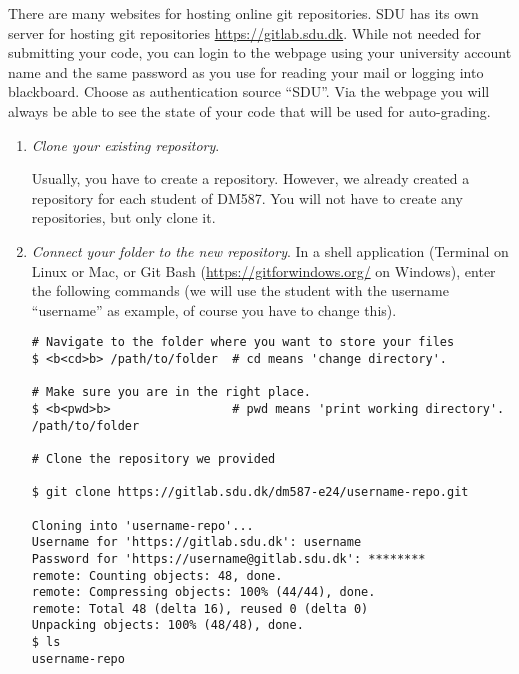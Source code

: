 There are many websites for hosting online git repositories. SDU has its own server for hosting git repositories  \url{https://gitlab.sdu.dk}. While not needed for submitting your code, you can login to the webpage using your university account name and the same password as you use for reading your mail or logging into blackboard. Choose as authentication source ``SDU''.
Via the webpage you will always be able to see the state of your code that will be used for auto-grading.


\begin{enumerate}

\item \emph{Clone your existing repository}.

  Usually, you have to create a repository. However, we already created a repository for each student of DM587. You will not have to create any repositories, but only clone it.
  
\item \emph{Connect your folder to the new repository}.
\label{step:connect-folder}\label{step:download-data}
In a shell application (Terminal on Linux or Mac, or Git Bash (\url{https://gitforwindows.org/} on Windows), enter the following commands (we will use the student with the username ``username'' as example, of course you have to change this).

\begin{lstlisting}
# Navigate to the folder where you want to store your files
$ <b<cd>b> /path/to/folder  # cd means 'change directory'.

# Make sure you are in the right place.
$ <b<pwd>b>                 # pwd means 'print working directory'.
/path/to/folder

# Clone the repository we provided

$ git clone https://gitlab.sdu.dk/dm587-e24/username-repo.git

Cloning into 'username-repo'...
Username for 'https://gitlab.sdu.dk': username
Password for 'https://username@gitlab.sdu.dk': ********
remote: Counting objects: 48, done.
remote: Compressing objects: 100% (44/44), done.
remote: Total 48 (delta 16), reused 0 (delta 0)
Unpacking objects: 100% (48/48), done.
$ ls 
username-repo


\end{lstlisting}
\end{enumerate}
